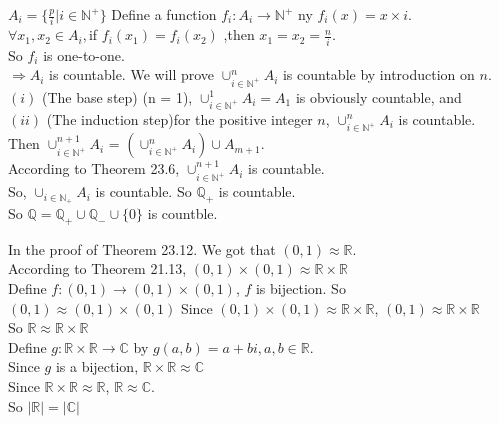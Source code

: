 \documentclass[a4paper, justified]{tufte-handout}
\begin{document}
\begin{solution}
  $A_i = \{\frac{p}{i} | i \in \mathbb{N} ^+\}$
  Define a function $f_i:A_i \rightarrow \mathbb{N} ^+$ ny $f_i(x) = x \times i$.\\
  $\forall x_1, x_2 \in A_i,$if $f_i(x_1) = f_i(x_2)$ ,then $x_1 = x_2 = \frac{n}{i}$.\\
  So $f_i$ is one-to-one.\\
  $\Rightarrow A_i$ is countable.
  We will prove $\cup_{i \in \mathbb{N^+}}^n A_i$ is countable by introduction on $n$.\\
  $(i)$ (The base step) (n = 1), $\cup_{i \in \mathbb{N^+}}^1 A_i = A_1$ is obviously countable, and\\
  $(ii)$ (The induction step)for the positive integer $n$, $\cup_{i \in \mathbb{N^+}}^n A_i$ is countable.\\
  Then $\cup_{i \in \mathbb{N^+}}^{n + 1} A_i$ = $(\cup_{i \in \mathbb{N^+}}^n A_i) \cup A_{m + 1}$.\\
  According to Theorem 23.6, $\cup_{i \in \mathbb{N^+}}^{n + 1} A_i$ is countable.\\
  So, $\cup_{i \in \mathbb{N}_+} A_i$ is countable.
  So $\mathbb{Q}_+$ is countable.\\
  So $\mathbb{Q} = \mathbb{Q}_+ \cup \mathbb{Q}_- \cup \{0\}$ is countble.
\end{solution}

\begin{problem}[UD Problem 24.16]
\end{problem}

\begin{solution}
  In the proof of Theorem 23.12. We got that $(0, 1) \approx \mathbb{R}$.\\
  According to Theorem 21.13, $(0, 1) \times (0, 1) \approx \mathbb{R} \times \mathbb{R}$\\
  Define $f:(0, 1) \rightarrow (0, 1) \times (0, 1)$, $f$ is bijection. So $(0, 1) \approx (0, 1) \times (0, 1)$
  Since $(0, 1) \times (0, 1) \approx \mathbb{R} \times \mathbb{R}$, $(0, 1) \approx \mathbb{R} \times \mathbb{R}$\\
  So $\mathbb{R} \approx \mathbb{R} \times \mathbb{R}$\\
  Define $g:\mathbb{R} \times \mathbb{R} \rightarrow \mathbb{C}$ by $g(a, b) = a + bi, a,b \in \mathbb{R}$.\\
  Since $g$ is a bijection, $\mathbb{R} \times \mathbb{R} \approx \mathbb{C}$\\
  Since $\mathbb{R} \times \mathbb{R} \approx \mathbb{R}$, $\mathbb{R} \approx \mathbb{C}$.\\
  So $|\mathbb{R}| = |\mathbb{C}|$
\end{solution}
\end{document}
